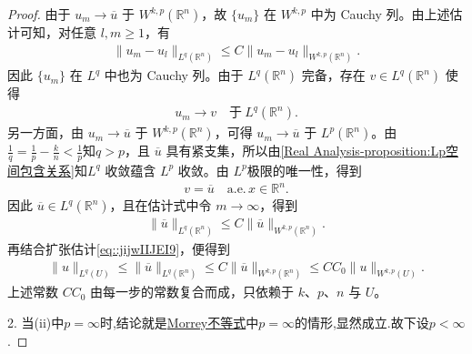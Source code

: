\documentclass[../../main.tex]{subfiles}
\begin{document}
\begin{proof}
由于 $u_{m}\to\overline{u}$ 于 $W^{k,p}(\mathbb{R}^{n})$，故 $\{u_{m}\}$ 在 $W^{k,p}$ 中为 Cauchy 列。由上述估计可知，对任意 $l,m\geqslant1$，有
\begin{align*}
\|u_{m}-u_{l}\|_{L^{q}(\mathbb{R}^{n})}\leqslant C\|u_{m}-u_{l}\|_{W^{k,p}(\mathbb{R}^{n})}.
\end{align*}
因此 $\{u_{m}\}$ 在 $L^{q}$ 中也为 Cauchy 列。由于 $L^{q}(\mathbb{R}^{n})$ 完备，存在 $v\in L^{q}(\mathbb{R}^{n})$ 使得
\begin{align*}
u_{m}\to v\quad\text{于}\ L^{q}(\mathbb{R}^{n}).
\end{align*}
另一方面，由 $u_{m}\to\overline{u}$ 于 $W^{k,p}(\mathbb{R}^{n})$，可得 $u_{m}\to\overline{u}$ 于 $L^{p}(\mathbb{R}^{n})$。由$\frac{1}{q}=\frac{1}{p}-\frac{k}{n}<\frac{1}{p}$知$q>p$，且 $\overline{u}$ 具有紧支集，所以由\cref{Real Analysis-proposition:Lp空间包含关系}知$L^{q}$ 收敛蕴含 $L^{p}$ 收敛。由 $L^{p}$极限的唯一性，得到
\begin{align*}
v=\overline{u}\quad\text{a.e.}\,x\in \mathbb{R}^n.
\end{align*}
因此 $\overline{u}\in L^{q}(\mathbb{R}^{n})$，且在估计式中令 $m\to\infty$，得到
\begin{align*}
\|\overline{u}\|_{L^{q}(\mathbb{R}^{n})}\leqslant C\|\overline{u}\|_{W^{k,p}(\mathbb{R}^{n})}.
\end{align*}
再结合扩张估计\eqref{eq::jijwIIJEI9}，便得到
\begin{align*}
\|u\|_{L^{q}(U)}
\leqslant\|\overline{u}\|_{L^{q}(\mathbb{R}^{n})}\leqslant C\|\overline{u}\|_{W^{k,p}(\mathbb{R}^{n})}\leqslant C C_{0}\|u\|_{W^{k,p}(U)}.
\end{align*}
上述常数 $C C_{0}$ 由每一步的常数复合而成，只依赖于 $k$、$p$、$n$ 与 $U$。

2. 当(ii)中$p=\infty$时,结论就是\hyperref[theorem:Morrey不等式]{Morrey不等式}中$p=\infty$的情形,显然成立.故下设$p<\infty$.


\end{proof}
\end{document}
